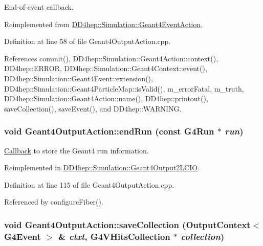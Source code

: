 End-\/of-\/event callback. 

Reimplemented from \hyperlink{class_d_d4hep_1_1_simulation_1_1_geant4_event_action_af131bad73c28da3419af7c29e0b8c250}{DD4hep::Simulation::Geant4EventAction}.

Definition at line 58 of file Geant4OutputAction.cpp.

References commit(), DD4hep::Simulation::Geant4Action::context(), DD4hep::ERROR, DD4hep::Simulation::Geant4Context::event(), DD4hep::Simulation::Geant4Event::extension(), DD4hep::Simulation::Geant4ParticleMap::isValid(), m\_\-errorFatal, m\_\-truth, DD4hep::Simulation::Geant4Action::name(), DD4hep::printout(), saveCollection(), saveEvent(), and DD4hep::WARNING.\hypertarget{class_d_d4hep_1_1_simulation_1_1_geant4_output_action_ac89540100411ccec1804da9afbb843a4}{
\subsubsection[{endRun}]{\setlength{\rightskip}{0pt plus 5cm}void Geant4OutputAction::endRun (const G4Run $\ast$ {\em run})}}
\label{class_d_d4hep_1_1_simulation_1_1_geant4_output_action_ac89540100411ccec1804da9afbb843a4}


\hyperlink{class_d_d4hep_1_1_callback}{Callback} to store the Geant4 run information. 

Reimplemented in \hyperlink{class_d_d4hep_1_1_simulation_1_1_geant4_output2_l_c_i_o_a9365b2b05b745a7807ce06163a7977fb}{DD4hep::Simulation::Geant4Output2LCIO}.

Definition at line 115 of file Geant4OutputAction.cpp.

Referenced by configureFiber().\hypertarget{class_d_d4hep_1_1_simulation_1_1_geant4_output_action_aa43d1f01dbcb11ac1d937a878d87a90f}{
\subsubsection[{saveCollection}]{\setlength{\rightskip}{0pt plus 5cm}void Geant4OutputAction::saveCollection ({\bf OutputContext}$<$ G4Event $>$ \& {\em ctxt}, \/  {\bf G4VHitsCollection} $\ast$ {\em collection})}}
\label{class_d_d4hep_1_1_simulation_1_1_geant4_output_action_aa43d1f01dbcb11ac1d937a878d87a90f}



